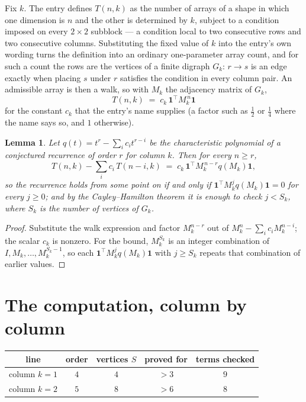 \documentclass[11pt,a4paper]{article}
\theoremstyle{plain}
\newtheorem{lemma}[theorem]{Lemma}
\theoremstyle{definition}
\begin{document}
Fix $k$. The entry defines $T(n,k)$ as the number of arrays of a shape in which one dimension
is $n$ and the other is determined by $k$, subject to a condition imposed on every
$2\times2$ subblock --- a condition local to two consecutive rows and two consecutive columns.
Substituting the fixed value of $k$ into the entry's own wording turns the definition into an
ordinary one-parameter array count, and for such a count the rows are the vertices of a finite
digraph $G_k$: $r\to s$ is an edge exactly when placing $s$ under $r$ satisfies the condition
in every column pair. An admissible array is then a walk, so with $M_k$ the adjacency matrix
of $G_k$,
\[
T(n,k)\;=\;c_k\,\mathbf{1}^{\!\top}M_k^{\,n}\mathbf{1}
\]
for the constant $c_k$ that the entry's name supplies (a factor such as $\tfrac12$ or
$\tfrac14$ where the name says so, and $1$ otherwise).

\begin{lemma}\label{lem:crit}
Let $q(t)=t^{r}-\sum_i c_it^{r-i}$ be the characteristic polynomial of a conjectured
recurrence of order $r$ for column $k$. Then for every $n\ge r$,
\[
T(n,k)-\sum_i c_i\,T(n-i,k)\;=\;c_k\,\mathbf{1}^{\!\top}M_k^{\,n-r}q(M_k)\mathbf{1},
\]
so the recurrence holds from some point on if and only if
$\mathbf{1}^{\!\top}M_k^{j}q(M_k)\mathbf{1}=0$ for every $j\ge0$; and by the
Cayley--Hamilton theorem it is enough to check $j<S_k$, where $S_k$ is the number of vertices
of $G_k$.
\end{lemma}

\begin{proof}
Substitute the walk expression and factor $M_k^{n-r}$ out of $M_k^{n}-\sum_ic_iM_k^{n-i}$;
the scalar $c_k$ is nonzero. For the bound, $M_k^{S_k}$ is an integer combination of
$I,M_k,\dots,M_k^{S_k-1}$, so each $\mathbf{1}^{\!\top}M_k^{j}q(M_k)\mathbf{1}$ with
$j\ge S_k$ repeats that combination of earlier values.
\end{proof}

\section{The computation, column by column}

\begin{center}
\begin{tabular}{ccccc}
line & order & vertices $S$ & proved for & terms checked \\ \hline
column $k$$=1$ & $4$ & $4$ & $>3$ & $9$ \\
column $k$$=2$ & $5$ & $8$ & $>6$ & $8$ \\
\end{tabular}
\end{center}
\end{document}
